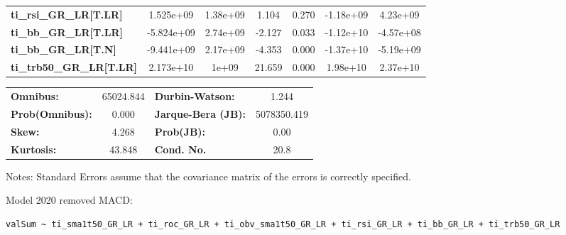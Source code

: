 \begin{center}
\begin{tabular}{lcccccc}
\textbf{ti\_rsi\_GR\_LR[T.LR]}          &    1.525e+09  &     1.38e+09     &     1.104  &         0.270        &    -1.18e+09    &     4.23e+09     \\
\textbf{ti\_bb\_GR\_LR[T.LR]}           &   -5.824e+09  &     2.74e+09     &    -2.127  &         0.033        &    -1.12e+10    &    -4.57e+08     \\
\textbf{ti\_bb\_GR\_LR[T.N]}            &   -9.441e+09  &     2.17e+09     &    -4.353  &         0.000        &    -1.37e+10    &    -5.19e+09     \\
\textbf{ti\_trb50\_GR\_LR[T.LR]}        &    2.173e+10  &        1e+09     &    21.659  &         0.000        &     1.98e+10    &     2.37e+10     \\
\bottomrule
\end{tabular}
\begin{tabular}{lclc}
\textbf{Omnibus:}       & 65024.844 & \textbf{  Durbin-Watson:     } &      1.244   \\
\textbf{Prob(Omnibus):} &    0.000  & \textbf{  Jarque-Bera (JB):  } & 5078350.419  \\
\textbf{Skew:}          &    4.268  & \textbf{  Prob(JB):          } &       0.00   \\
\textbf{Kurtosis:}      &   43.848  & \textbf{  Cond. No.          } &       20.8   \\
\bottomrule
\end{tabular}
\end{center}

Notes: \newline
 [1] Standard Errors assume that the covariance matrix of the errors is correctly specified.

Model 2020 removed MACD: \begin{verbatim}valSum ~ ti_sma1t50_GR_LR + ti_roc_GR_LR + ti_obv_sma1t50_GR_LR + ti_rsi_GR_LR + ti_bb_GR_LR + ti_trb50_GR_LR\end{verbatim}

